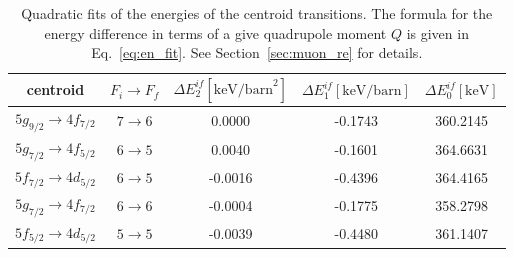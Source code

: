 %
%
%
%
\begin{table}[b]
\caption{\label{tab:re185centroid}%
Quadratic fits of the energies of the centroid transitions. The formula for the energy difference in terms of a give quadrupole moment $Q$ is given in Eq.~\eqref{eq:en_fit}. See Section~\ref{sec:muon_re} for details.}
\centering
\begin{small}
\begin{tabular}{cc|ccc}
centroid& $F_i \rightarrow F_f$ & $\Delta E_2^{if} [\text{keV/barn}^2]$ & $\Delta E_1^{if} [\text{keV/barn}]$ & $\Delta E_0^{if} [\text{keV}]$\\[1pt]\hline%
$5g_{9/2} \rightarrow 4f_{7/2}$ & $7 \rightarrow 6$ & 0.0000 & -0.1743 & 360.2145\\
$5g_{7/2} \rightarrow 4f_{5/2}$ & $6 \rightarrow 5$ & 0.0040 & -0.1601 & 364.6631\\
$5f_{7/2} \rightarrow 4d_{5/2}$ & $6 \rightarrow 5$ &-0.0016 & -0.4396 & 364.4165\\
$5g_{7/2} \rightarrow 4f_{7/2}$ & $6 \rightarrow 6$ &-0.0004 & -0.1775 & 358.2798\\
$5f_{5/2} \rightarrow 4d_{5/2}$ & $5 \rightarrow 5$ &-0.0039 & -0.4480 & 361.1407
\end{tabular}
\end{small}
\end{table}%
%
%
%
